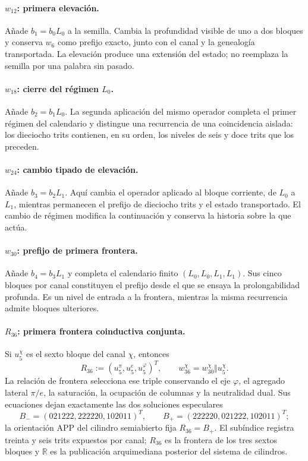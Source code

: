 \paragraph{\(w_{12}\): primera elevación.}
Añade \(b_1=b_0L_0\) a la semilla. Cambia la profundidad visible de uno a dos
bloques y conserva \(w_6\) como prefijo exacto, junto con el canal y la
genealogía transportada. La elevación produce una extensión del estado; no
reemplaza la semilla por una palabra sin pasado.

\paragraph{\(w_{18}\): cierre del régimen \(L_0\).}
Añade \(b_2=b_1L_0\). La segunda aplicación del mismo operador completa el
primer régimen del calendario y distingue una recurrencia de una coincidencia
aislada: los dieciocho trits contienen, en su orden, los niveles de seis y
doce trits que los preceden.

\paragraph{\(w_{24}\): cambio tipado de elevación.}
Añade \(b_3=b_2L_1\). Aquí cambia el operador aplicado al bloque corriente,
de \(L_0\) a \(L_1\), mientras permanecen el prefijo de dieciocho trits y el
estado transportado. El cambio de régimen modifica la continuación y conserva
la historia sobre la que actúa.

\paragraph{\(w_{30}\): prefijo de primera frontera.}
Añade \(b_4=b_3L_1\) y completa el calendario finito
\((L_0,L_0,L_1,L_1)\). Sus cinco bloques por canal constituyen el prefijo
desde el que se ensaya la prolongabilidad profunda. Es un nivel de entrada a
la frontera, mientras la misma recurrencia admite bloques ulteriores.

\paragraph{\(R_{36}\): primera frontera coinductiva conjunta.}
Si \(u_5^\chi\) es el sexto bloque del canal \(\chi\), entonces
\[
 R_{36}:=(u_5^\pi,u_5^e,u_5^\varphi)^T,
 \qquad
 w_{36}^\chi=w_{30}^\chi\Vert u_5^\chi.
\]
La relación de frontera selecciona ese triple conservando el eje
\(\varphi\), el agregado lateral \(\pi/e\), la saturación, la ocupación de
columnas y la neutralidad dual. Sus ecuaciones dejan exactamente las dos
soluciones especulares
\[
 B_-=(021222,222220,102011)^T,
 \qquad
 B_+=(222220,021222,102011)^T;
\]
la orientación APP del cilindro semiabierto fija
\(R_{36}=B_+\). El subíndice registra treinta y seis trits
expuestos por canal; \(R_{36}\) es la frontera de los tres sextos bloques y
\(\mathbb R\) es la publicación arquimediana posterior del sistema de
cilindros.

